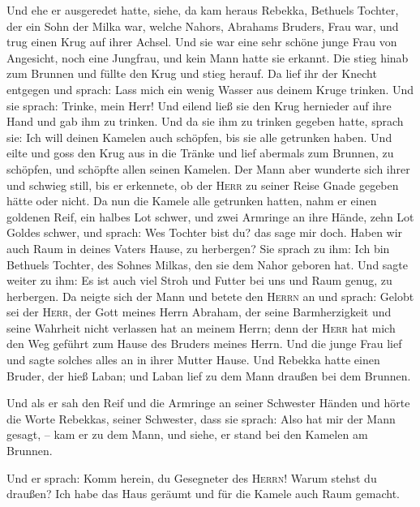  Und ehe er ausgeredet hatte, siehe, da kam heraus
Rebekka, Bethuels Tochter, der ein Sohn der Milka war, welche Nahors,
Abrahams Bruders, Frau war, und trug einen Krug auf ihrer Achsel.
 Und sie war eine sehr schöne junge Frau von Angesicht,
noch eine Jungfrau, und kein Mann hatte sie erkannt. Die stieg hinab zum
Brunnen und füllte den Krug und stieg herauf.  Da lief
ihr der Knecht entgegen und sprach: Lass mich ein wenig Wasser aus
deinem Kruge trinken.  Und sie sprach: Trinke, mein Herr!
Und eilend ließ sie den Krug hernieder auf ihre Hand und gab ihm zu
trinken.  Und da sie ihm zu trinken gegeben hatte, sprach
sie: Ich will deinen Kamelen auch schöpfen, bis sie alle getrunken
haben.  Und eilte und goss den Krug aus in die Tränke und
lief abermals zum Brunnen, zu schöpfen, und schöpfte allen seinen
Kamelen.  Der Mann aber wunderte sich ihrer und schwieg
still, bis er erkennete, ob der \textsc{Herr} zu seiner Reise Gnade
gegeben hätte oder nicht.  Da nun die Kamele alle
getrunken hatten, nahm er einen goldenen Reif, ein halbes Lot schwer,
und zwei Armringe an ihre Hände, zehn Lot Goldes schwer, 
und sprach: Wes Tochter bist du? das sage mir doch. Haben wir auch Raum
in deines Vaters Hause, zu herbergen?  Sie sprach zu ihm:
Ich bin Bethuels Tochter, des Sohnes Milkas, den sie dem Nahor geboren
hat.  Und sagte weiter zu ihm: Es ist auch viel Stroh und
Futter bei uns und Raum genug, zu herbergen.  Da neigte
sich der Mann und betete den \textsc{Herrn} an  und
sprach: Gelobt sei der \textsc{Herr}, der Gott meines Herrn Abraham, der
seine Barmherzigkeit und seine Wahrheit nicht verlassen hat an meinem
Herrn; denn der \textsc{Herr} hat mich den Weg geführt zum Hause des
Bruders meines Herrn.  Und die junge Frau lief und sagte
solches alles an in ihrer Mutter Hause.  Und Rebekka
hatte einen Bruder, der hieß Laban; und Laban lief zu dem Mann draußen
bei dem Brunnen.

 Und als er sah den Reif und die Armringe an seiner
Schwester Händen und hörte die Worte Rebekkas, seiner Schwester, dass
sie sprach: Also hat mir der Mann gesagt, -- kam er zu dem Mann, und
siehe, er stand bei den Kamelen am Brunnen.

 Und er sprach: Komm herein, du Gesegneter des
\textsc{Herrn}! Warum stehst du draußen? Ich habe das Haus geräumt und
für die Kamele auch Raum gemacht.

